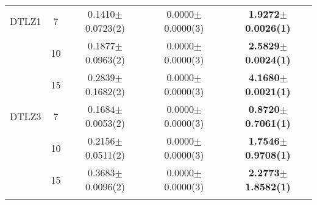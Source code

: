 \begin{table}[]
\begin{adjustbox}{width=0.50\textwidth,center}
\begin{tabular}{ccccc}
      DTLZ1 & 7    & 0.1410$\pm$0.0723(2)  & 0.0000$\pm$0.0000(3) & \textbf{1.9272$\pm$0.0026(1)} \\
      & 10   & 0.1877$\pm$0.0963(2)  & 0.0000$\pm$0.0000(3) & \textbf{2.5829$\pm$0.0024(1)} \\
      & 15   & 0.2839$\pm$0.1682(2)  & 0.0000$\pm$0.0000(3) & \textbf{4.1680$\pm$0.0021(1)} \\\thickhline
DTLZ3 & 7    & 0.1684$\pm$0.0053(2)  & 0.0000$\pm$0.0000(3) & \textbf{0.8720$\pm$0.7061(1)} \\
      & 10   & 0.2156$\pm$0.0511(2)  & 0.0000$\pm$0.0000(3) & \textbf{1.7546$\pm$0.9708(1)} \\
      & 15   & 0.3683$\pm$0.0096(2)  & 0.0000$\pm$0.0000(3) & \textbf{2.2773$\pm$1.8582(1)} \\\thickhline
\end{tabular}
\end{adjustbox}
\end{table}